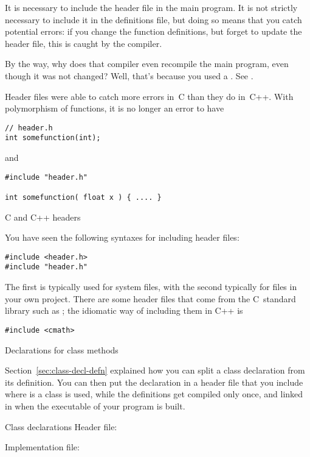 It is necessary to include the header file in the main program. It is
not strictly necessary to include it in the definitions file, but
doing so means that you catch potential errors: if you change the
function definitions, but forget to update the header file, this is
caught by the compiler.

\begin{remark}
  By the way, why does that compiler even recompile the main program,
  even though it was not changed? Well, that's because you used a
  . See .
\end{remark}
\begin{remark}
  Header files were able to catch more errors in~C than they do
  in~C++. With polymorphism of functions, it is no longer an error to
  have 
\begin{lstlisting}
// header.h
int somefunction(int);
\end{lstlisting}
and
\begin{lstlisting}
#include "header.h"

int somefunction( float x ) { .... }
\end{lstlisting}
\end{remark}

 {C and C++ headers}

You have seen the following syntaxes for including header files:
\begin{lstlisting}
#include <header.h>
#include "header.h"
\end{lstlisting}
The first is typically used for system files, with the second
typically for files in your own project. There are some header files
that come from the C~standard library such as ; the
idiomatic way of including them in C++ is
\begin{lstlisting}
#include <cmath>
\end{lstlisting}

 {Declarations for class methods}
\label{sec:class-header-file}

Section~\ref{sec:class-decl-defn} explained how you can split a
class declaration from its definition.
You can then put the declaration in a header file that
you include where is a class is used,
while the definitions get compiled only once,
and linked in when the executable of your program is built.

\begin{block}{Class declarations}
  \label{sl:class-proto}
  Header file:

  Implementation file:
\end{block}

